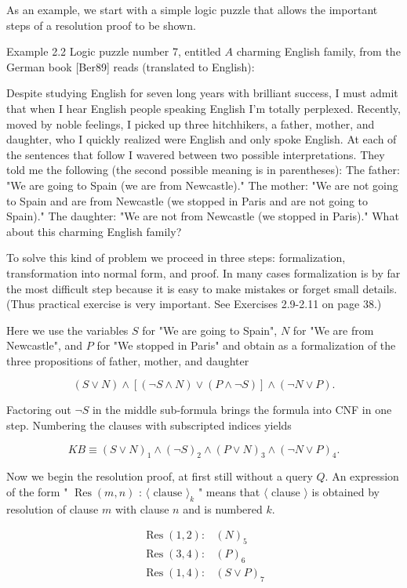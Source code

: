 \documentclass[10pt]{article}
\begin{document}
As an example, we start with a simple logic puzzle that allows the important steps of a resolution proof to be shown.

Example 2.2 Logic puzzle number 7, entitled $A$ charming English family, from the German book [Ber89] reads (translated to English):


Despite studying English for seven long years with brilliant success, I must admit that when I hear English people speaking English I'm totally perplexed. Recently, moved by noble feelings, I picked up three hitchhikers, a father, mother, and daughter, who I quickly realized were English and only spoke English. At each of the sentences that follow I wavered between two possible interpretations. They told me the following (the second possible meaning is in parentheses): The father: "We are going to Spain (we are from Newcastle)." The mother: "We are not going to Spain and are from Newcastle (we stopped in Paris and are not going to Spain)." The daughter: "We are not from Newcastle (we stopped in Paris)." What about this charming English family?

To solve this kind of problem we proceed in three steps: formalization, transformation into normal form, and proof. In many cases formalization is by far the most difficult step because it is easy to make mistakes or forget small details. (Thus practical exercise is very important. See Exercises 2.9-2.11 on page 38.)

Here we use the variables $S$ for "We are going to Spain", $N$ for "We are from Newcastle", and $P$ for "We stopped in Paris" and obtain as a formalization of the three propositions of father, mother, and daughter

$$
(S \vee N) \wedge[(\neg S \wedge N) \vee(P \wedge \neg S)] \wedge(\neg N \vee P) .
$$

Factoring out $\neg S$ in the middle sub-formula brings the formula into CNF in one step. Numbering the clauses with subscripted indices yields

$$
K B \equiv(S \vee N)_{1} \wedge(\neg S)_{2} \wedge(P \vee N)_{3} \wedge(\neg N \vee P)_{4} .
$$

Now we begin the resolution proof, at first still without a query $Q$. An expression of the form " $\operatorname{Res}(m, n)$ : $\langle\text { clause }\rangle_{k}$ " means that $\langle$ clause $\rangle$ is obtained by resolution of clause $m$ with clause $n$ and is numbered $k$.

$$
\begin{array}{ll}
\operatorname{Res}(1,2): & (N)_{5} \\
\operatorname{Res}(3,4): & (P)_{6} \\
\operatorname{Res}(1,4): & (S \vee P)_{7}
\end{array}
$$
\end{document}
